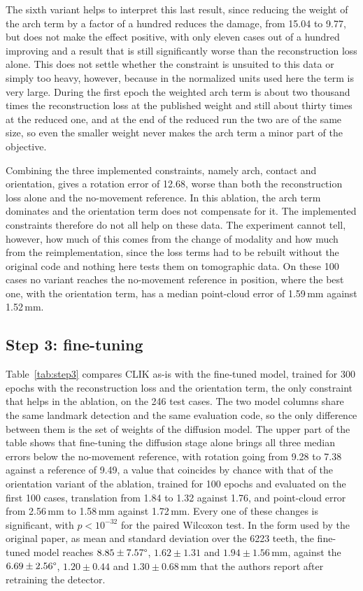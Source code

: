 \documentclass[10pt,a4paper]{article}
\begin{document}
The sixth variant helps to interpret this last result, since reducing the weight of the arch term by a factor of a hundred reduces the damage, from 15.04\degree{} to 9.77\degree{}, but does not make the effect positive, with only eleven cases out of a hundred improving and a result that is still significantly worse than the reconstruction loss alone. This does not settle whether the constraint is unsuited to this data or simply too heavy, however, because in the normalized units used here the term is very large. During the first epoch the weighted arch term is about two thousand times the reconstruction loss at the published weight and still about thirty times at the reduced one, and at the end of the reduced run the two are of the same size, so even the smaller weight never makes the arch term a minor part of the objective.

Combining the three implemented constraints, namely arch, contact and orientation, gives a rotation error of 12.68\degree{}, worse than both the reconstruction loss alone and the no-movement reference. In this ablation, the arch term dominates and the orientation term does not compensate for it. The implemented constraints therefore do not all help on these data. The experiment cannot tell, however, how much of this comes from the change of modality and how much from the reimplementation, since the loss terms had to be rebuilt without the original code and nothing here tests them on tomographic data. On these 100 cases no variant reaches the no-movement reference in position, where the best one, with the orientation term, has a median point-cloud error of 1.59\,mm against 1.52\,mm.

\subsection{Step 3: fine-tuning}
\label{sec:res-step3}

Table~\ref{tab:step3} compares CLIK as-is with the fine-tuned model, trained for 300 epochs with the reconstruction loss and the orientation term, the only constraint that helps in the ablation, on the 246 test cases. The two model columns share the same landmark detection and the same evaluation code, so the only difference between them is the set of weights of the diffusion model. The upper part of the table shows that fine-tuning the diffusion stage alone brings all three median errors below the no-movement reference, with rotation going from 9.28\degree{} to 7.38\degree{} against a reference of 9.49\degree{}, a value that coincides by chance with that of the orientation variant of the ablation, trained for 100 epochs and evaluated on the first 100 cases, translation from 1.84 to 1.32 against 1.76, and point-cloud error from 2.56\,mm to 1.58\,mm against 1.72\,mm. Every one of these changes is significant, with $p < 10^{-32}$ for the paired Wilcoxon test. In the form used by the original paper, as mean and standard deviation over the 6223 teeth, the fine-tuned model reaches $8.85 \pm 7.57\degree{}$, $1.62 \pm 1.31$ and $1.94 \pm 1.56$\,mm, against the $6.69 \pm 2.56\degree{}$, $1.20 \pm 0.44$ and $1.30 \pm 0.68$\,mm that the authors report after retraining the detector.
\end{document}
